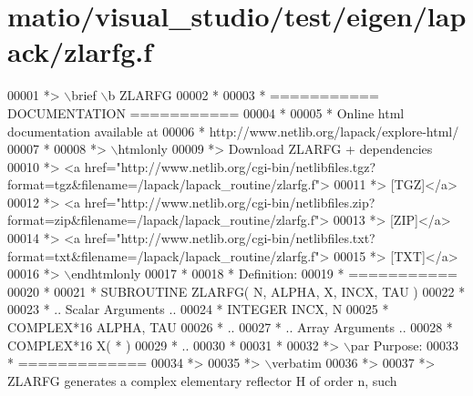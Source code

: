 \hypertarget{matio_2visual__studio_2test_2eigen_2lapack_2zlarfg_8f_source}{}\section{matio/visual\+\_\+studio/test/eigen/lapack/zlarfg.f}
\label{matio_2visual__studio_2test_2eigen_2lapack_2zlarfg_8f_source}

\begin{DoxyCode}
00001 \textcolor{comment}{*> \(\backslash\)brief \(\backslash\)b ZLARFG}
00002 \textcolor{comment}{*}
00003 \textcolor{comment}{*  =========== DOCUMENTATION ===========}
00004 \textcolor{comment}{*}
00005 \textcolor{comment}{* Online html documentation available at }
00006 \textcolor{comment}{*            http://www.netlib.org/lapack/explore-html/ }
00007 \textcolor{comment}{*}
00008 \textcolor{comment}{*> \(\backslash\)htmlonly}
00009 \textcolor{comment}{*> Download ZLARFG + dependencies }
00010 \textcolor{comment}{*> <a
       href="http://www.netlib.org/cgi-bin/netlibfiles.tgz?format=tgz&filename=/lapack/lapack\_routine/zlarfg.f"> }
00011 \textcolor{comment}{*> [TGZ]</a> }
00012 \textcolor{comment}{*> <a
       href="http://www.netlib.org/cgi-bin/netlibfiles.zip?format=zip&filename=/lapack/lapack\_routine/zlarfg.f"> }
00013 \textcolor{comment}{*> [ZIP]</a> }
00014 \textcolor{comment}{*> <a
       href="http://www.netlib.org/cgi-bin/netlibfiles.txt?format=txt&filename=/lapack/lapack\_routine/zlarfg.f"> }
00015 \textcolor{comment}{*> [TXT]</a>}
00016 \textcolor{comment}{*> \(\backslash\)endhtmlonly }
00017 \textcolor{comment}{*}
00018 \textcolor{comment}{*  Definition:}
00019 \textcolor{comment}{*  ===========}
00020 \textcolor{comment}{*}
00021 \textcolor{comment}{*       SUBROUTINE ZLARFG( N, ALPHA, X, INCX, TAU )}
00022 \textcolor{comment}{* }
00023 \textcolor{comment}{*       .. Scalar Arguments ..}
00024 \textcolor{comment}{*       INTEGER            INCX, N}
00025 \textcolor{comment}{*       COMPLEX*16         ALPHA, TAU}
00026 \textcolor{comment}{*       ..}
00027 \textcolor{comment}{*       .. Array Arguments ..}
00028 \textcolor{comment}{*       COMPLEX*16         X( * )}
00029 \textcolor{comment}{*       ..}
00030 \textcolor{comment}{*  }
00031 \textcolor{comment}{*}
00032 \textcolor{comment}{*> \(\backslash\)par Purpose:}
00033 \textcolor{comment}{*  =============}
00034 \textcolor{comment}{*>}
00035 \textcolor{comment}{*> \(\backslash\)verbatim}
00036 \textcolor{comment}{*>}
00037 \textcolor{comment}{*> ZLARFG generates a complex elementary reflector H of order n, such}

\end{DoxyCode}
